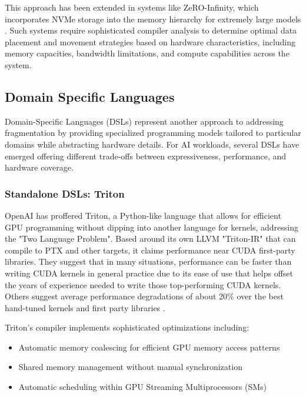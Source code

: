 \documentclass[manuscript,screen,review,format=acmsmall]{acmart}
\begin{document}
This approach has been extended in systems like ZeRO-Infinity, which incorporates NVMe storage into the memory hierarchy for extremely large models \cite{RajbhandariSamyam2021ZbtG}. Such systems require sophisticated compiler analysis to determine optimal data placement and movement strategies based on hardware characteristics, including memory capacities, bandwidth limitations, and compute capabilities across the system.

\subsection{Domain Specific Languages}

Domain-Specific Languages (DSLs) represent another approach to addressing fragmentation by providing specialized programming models tailored to particular domains while abstracting hardware details. For AI workloads, several DSLs have emerged offering different trade-offs between expressiveness, performance, and hardware coverage.

\subsubsection{Standalone DSLs: Triton}

OpenAI has proffered Triton\cite{Triton}, a Python-like language that allows for efficient GPU programming without dipping into another language for kernels, addressing the "Two Language Problem". Based around its own LLVM "Triton-IR" that can compile to PTX and other targets, it claims performance near CUDA first-party libraries. They suggest that in many situations, performance can be faster than writing CUDA kernels in general practice due to its ease of use that helps offset the years of experience needed to write those top-performing CUDA kernels. Others suggest average performance degradations of about 20\% over the best hand-tuned kernels and first party libraries \cite{Modular7}.

Triton's compiler implements sophisticated optimizations including:
\begin{itemize}
    \item Automatic memory coalescing for efficient GPU memory access patterns
    \item Shared memory management without manual synchronization
    \item Automatic scheduling within GPU Streaming Multiprocessors (SMs)
\end{itemize}
\end{document}
